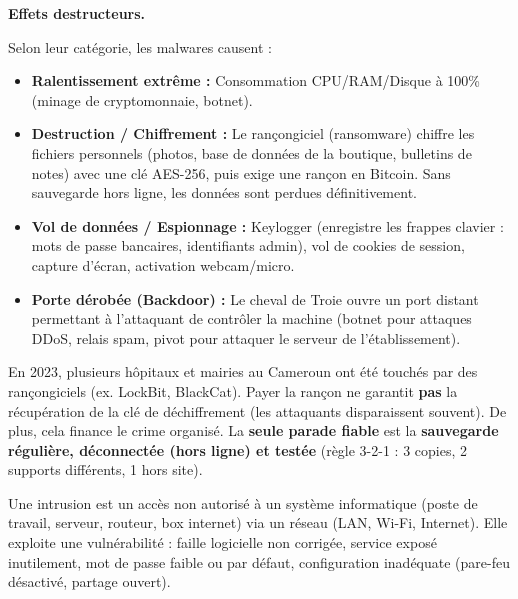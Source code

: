 \documentclass[11pt]{article}
\newcommand{\cle}[1]{{\popxbold\color{popdark}#1}}
\newcounter{popsec}
\newcounter{popsub}
\newcommand{\courssub}[1]{%
  \stepcounter{popsub}%
  \par\vspace{9pt}\noindent{\popxbold\fontsize{11.5}{13}\selectfont\color{popink}{\color{poporange}\thepopsec.\thepopsub}\hspace{6pt}#1}\par\nopagebreak\vspace{4pt}
}
\begin{document}
\textbf{Effets destructeurs.}\par
Selon leur catégorie, les malwares causent :
\begin{itemize}
    \item \textbf{Ralentissement extrême :} Consommation CPU/RAM/Disque à 100\% (minage de cryptomonnaie, botnet).
    \item \textbf{Destruction / Chiffrement :} Le \cle{rançongiciel (ransomware)} chiffre les fichiers personnels (photos, base de données de la boutique, bulletins de notes) avec une clé AES-256, puis exige une rançon en Bitcoin. Sans sauvegarde hors ligne, les données sont perdues définitivement.
    \item \textbf{Vol de données / Espionnage :} \cle{Keylogger} (enregistre les frappes clavier : mots de passe bancaires, identifiants admin), vol de cookies de session, capture d'écran, activation webcam/micro.
    \item \textbf{Porte dérobée (Backdoor) :} Le \cle{cheval de Troie} ouvre un port distant permettant à l'attaquant de contrôler la machine (botnet pour attaques DDoS, relais spam, pivot pour attaquer le serveur de l'établissement).
\end{itemize}

\begin{savaistu}
En 2023, plusieurs hôpitaux et mairies au Cameroun ont été touchés par des rançongiciels (ex. LockBit, BlackCat). Payer la rançon ne garantit \textbf{pas} la récupération de la clé de déchiffrement (les attaquants disparaissent souvent). De plus, cela finance le crime organisé. La \textbf{seule parade fiable} est la \textbf{sauvegarde régulière, déconnectée (hors ligne) et testée} (règle 3-2-1 : 3 copies, 2 supports différents, 1 hors site).
\end{savaistu}

\courssub{Les intrusions réseau}

\begin{definition}
Une \cle{intrusion} est un accès non autorisé à un système informatique (poste de travail, serveur, routeur, box internet) via un réseau (LAN, Wi-Fi, Internet). Elle exploite une vulnérabilité : faille logicielle non corrigée, service exposé inutilement, mot de passe faible ou par défaut, configuration inadéquate (pare-feu désactivé, partage ouvert).
\end{definition}
\end{document}
